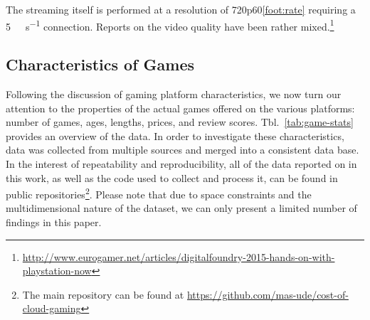 
The streaming itself is performed at a resolution of 720p60\cref{foot:rate} requiring a \SI{5}{\mega\bit\per\second} connection. Reports on the video quality have been rather mixed.\footnote{\url{http://www.eurogamer.net/articles/digitalfoundry-2015-hands-on-with-playstation-now}} %





\subsection{Characteristics of Games}

Following the discussion of gaming platform characteristics, we now turn our attention to the properties of the actual games offered on the various platforms: number of games, ages, lengths, prices, and review scores. Tbl.~\ref{tab:game-stats} provides an overview of the data.
In order to investigate these characteristics, data was collected from multiple sources and merged into a consistent data base. In the interest of repeatability and reproducibility, all of the data reported on in this work, as well as the code used to collect and process it, can be found in public repositories\footnote{The main repository can be found at \url{https://github.com/mas-ude/cost-of-cloud-gaming}}. Please note that due to space constraints and the multidimensional nature of the dataset, we can only present a limited number of findings in this paper.

